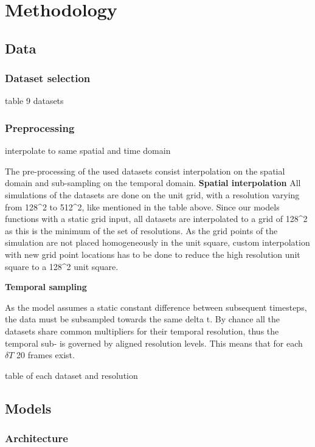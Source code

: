 \section{Methodology}

\subsection{Data}

\subsubsection{Dataset selection}

table 9 datasets

\subsubsection{Preprocessing}

interpolate to same spatial and time domain

The pre-processing of the used datasets consist interpolation on the spatial domain and sub-sampling on the temporal domain.
\textbf{Spatial interpolation}
All simulations of the datasets are done on the unit grid, with a resolution varying from 128^2 to 512^2, like mentioned in the table above. Since our models functions with a static grid input, all datasets are interpolated to a grid of 128^2 as this is the minimum of the set of resolutions. As the grid points of the simulation are not placed homogeneously in the unit square, custom interpolation with new grid point locations has to be done to reduce the high resolution unit square to a 128^2 unit square.

\textbf{Temporal sampling}

As the model assumes a static constant difference between subsequent timesteps, the data must be subsampled towards the same delta t. By chance all the datasets share common multipliers for their temporal resolution, thus the temporal sub-  is governed by aligned resolution levels. This means that for each $\delta T$ 20 frames exist.

table of each dataset and resolution

\subsection{Models}

\subsubsection{Architecture}

